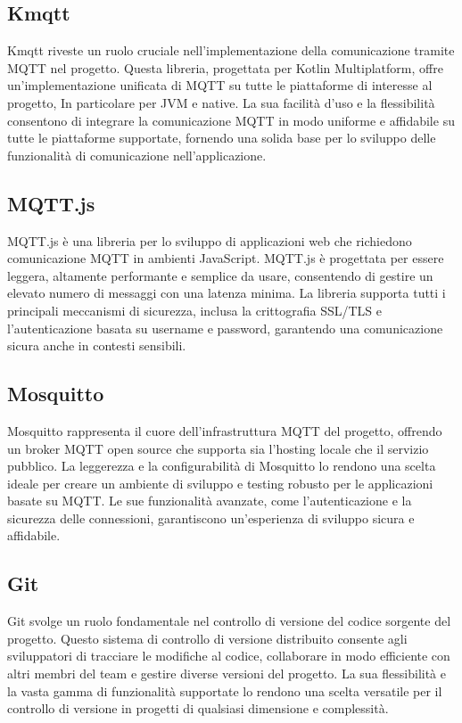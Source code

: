 \documentclass[12pt,a4paper,openright,twoside]{book}
\begin{document}
\subsection{Kmqtt}
Kmqtt riveste un ruolo cruciale nell'implementazione della comunicazione tramite \ac{MQTT} nel progetto. Questa libreria, progettata per Kotlin Multiplatform, offre 
un'implementazione unificata di \ac{MQTT} su tutte le piattaforme di interesse al progetto, In particolare per \ac{JVM} e native. La sua facilità d'uso e la flessibilità consentono di integrare la comunicazione 
\ac{MQTT} in modo uniforme e affidabile su tutte le piattaforme supportate, fornendo una solida base per lo sviluppo delle funzionalità di comunicazione nell'applicazione.

\subsection{MQTT.js}
MQTT.js è una libreria per lo sviluppo di applicazioni web che richiedono comunicazione \ac{MQTT} in ambienti JavaScript. 
MQTT.js è progettata per essere leggera, altamente performante e semplice da usare, consentendo di gestire un elevato numero di messaggi con una latenza minima. 
La libreria supporta tutti i principali meccanismi di sicurezza, inclusa la crittografia SSL/TLS e l'autenticazione basata su username e password, garantendo una comunicazione 
sicura anche in contesti sensibili.

\subsection{Mosquitto}

Mosquitto rappresenta il cuore dell'infrastruttura \ac{MQTT} del progetto, offrendo un broker \ac{MQTT} open source che supporta sia l'hosting locale che il servizio pubblico. 
La leggerezza e la configurabilità di Mosquitto lo rendono una scelta ideale per creare un ambiente di sviluppo e testing robusto per le applicazioni basate su \ac{MQTT}. 
Le sue funzionalità avanzate, come l'autenticazione e la sicurezza delle connessioni, garantiscono un'esperienza di sviluppo sicura e affidabile.

\subsection{Git}
Git svolge un ruolo fondamentale nel controllo di versione del codice sorgente del progetto. Questo sistema di controllo di versione distribuito consente agli sviluppatori 
di tracciare le modifiche al codice, collaborare in modo efficiente con altri membri del team e gestire diverse versioni del progetto. La sua flessibilità e la vasta gamma 
di funzionalità supportate lo rendono una scelta versatile per il controllo di versione in progetti di qualsiasi dimensione e complessità.
\end{document}
